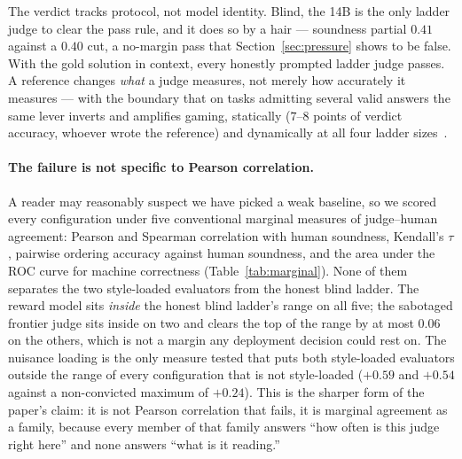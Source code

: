\documentclass[11pt]{article}
\begin{document}
The verdict tracks protocol, not model identity.
Blind, the 14B is the only ladder judge to clear the pass rule, and it does so by a hair --- soundness partial $0.41$ against a $0.40$ cut, a no-margin pass that Section~\ref{sec:pressure} shows to be false.
With the gold solution in context, every honestly prompted ladder judge passes.
A reference changes \emph{what} a judge measures, not merely how accurately it measures --- with the boundary that on tasks admitting several valid answers the same lever inverts and amplifies gaming, statically ($7$--$8$ points of verdict accuracy, whoever wrote the reference) and dynamically at all four ladder sizes~\cite{companionD}.

\paragraph{The failure is not specific to Pearson correlation.}
A reader may reasonably suspect we have picked a weak baseline, so we scored every configuration under five conventional marginal measures of judge--human agreement: Pearson and Spearman correlation with human soundness, Kendall's $\tau$, pairwise ordering accuracy against human soundness, and the area under the ROC curve for machine correctness (Table~\ref{tab:marginal}).
None of them separates the two style-loaded evaluators from the honest blind ladder.
The reward model sits \emph{inside} the honest blind ladder's range on all five; the sabotaged frontier judge sits inside on two and clears the top of the range by at most $0.06$ on the others, which is not a margin any deployment decision could rest on.
The nuisance loading is the only measure tested that puts both style-loaded evaluators outside the range of every configuration that is not style-loaded ($+0.59$ and $+0.54$ against a non-convicted maximum of $+0.24$).
This is the sharper form of the paper's claim: it is not Pearson correlation that fails, it is marginal agreement as a family, because every member of that family answers ``how often is this judge right here'' and none answers ``what is it reading.''
\end{document}
